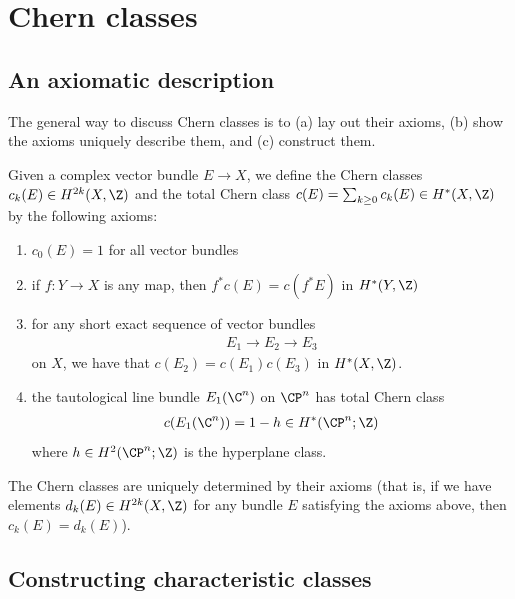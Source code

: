 \documentclass[11pt]{amsart}
\begin{document}
\section{Chern classes}

\subsection{An axiomatic description}

The general way to discuss Chern classes is to (a) lay out their axioms, (b) show the axioms uniquely describe them, and (c) construct them.

\begin{definition}\label{def:chern-classes} Given a complex vector bundle $E \to X$, we define the Chern classes $c_k(E) \in H^{2k}(X,\Z)$ and the total Chern class $c(E) = \sum_{k\ge0} c_k(E) \in H^\ast(X,\Z)$ by the following axioms:
\begin{enumerate}
    \item $c_0(E) = 1$ for all vector bundles
    \item if $f \colon Y \to X$ is any map, then $f^\ast c(E) = c(f^\ast E)$ in $H^\ast(Y,\Z)$
    \item for any short exact sequence of vector bundles
    \begin{align*}
        E_1 \to E_2\to E_3
    \end{align*}
    on $X$, we have that $c(E_2) = c(E_1)c(E_3)$ in $H^\ast(X,\Z)$.
    \item the tautological line bundle $E_1(\C^n)$ on $\CP^n$ has total Chern class
    \begin{align*}
        c(E_1(\C^n)) = 1 -h \in H^\ast(\CP^n;\Z)
    \end{align*}
    where $h \in H^2(\CP^n;\Z)$ is the hyperplane class.
\end{enumerate}
\end{definition}

\begin{proposition}
The Chern classes are uniquely determined by their axioms (that is, if we have elements $d_k(E) \in H^{2k}(X,\Z)$ for any bundle $E$ satisfying the axioms above, then $c_k(E) = d_k(E)$).
\end{proposition}


\subsection{Constructing characteristic classes}
\end{document}
